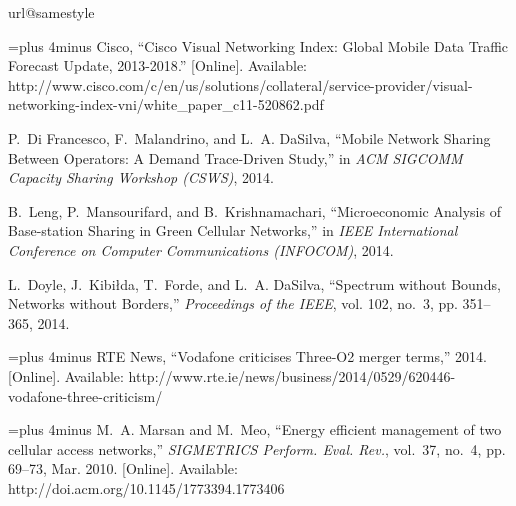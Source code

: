 \documentclass[10pt,journal,cspaper,compsoc]{IEEEtran}
\begin{document}


\begin{thebibliography}{10}
\providecommand{\url}[1]{#1}
\csname url@samestyle\endcsname
\providecommand{\newblock}{\relax}
\providecommand{\bibinfo}[2]{#2}
\providecommand{\BIBentrySTDinterwordspacing}{\spaceskip=0pt\relax}
\providecommand{\BIBentryALTinterwordstretchfactor}{4}
\providecommand{\BIBentryALTinterwordspacing}{\spaceskip=\fontdimen2\font plus
\BIBentryALTinterwordstretchfactor\fontdimen3\font minus
  \fontdimen4\font\relax}
\providecommand{\BIBforeignlanguage}[2]{{\expandafter\ifx\csname l@#1\endcsname\relax
\typeout{** WARNING: IEEEtran.bst: No hyphenation pattern has been}\typeout{** loaded for the language `#1'. Using the pattern for}\typeout{** the default language instead.}\else
\language=\csname l@#1\endcsname
\fi
#2}}
\providecommand{\BIBdecl}{\relax}
\BIBdecl

\BIBentryALTinterwordspacing
Cisco, ``{Cisco Visual Networking Index: Global Mobile Data Traffic Forecast
  Update, 2013-2018}.'' [Online]. Available:
  \url{http://www.cisco.com/c/en/us/solutions/collateral/service-provider/visual-networking-index-vni/white_paper_c11-520862.pdf}
\BIBentrySTDinterwordspacing

P.~{Di Francesco}, F.~Malandrino, and L.~A. DaSilva, ``{Mobile Network Sharing
  Between Operators: A Demand Trace-Driven Study},'' in \emph{ACM SIGCOMM
  Capacity Sharing Workshop (CSWS)}, 2014.

B.~Leng, P.~Mansourifard, and B.~Krishnamachari, ``{Microeconomic Analysis of
  Base-station Sharing in Green Cellular Networks},'' in \emph{IEEE
  International Conference on Computer Communications (INFOCOM)}, 2014.

L.~Doyle, J.~Kibi{\l}da, T.~Forde, and L.~A. DaSilva, ``{Spectrum without
  Bounds, Networks without Borders},'' \emph{Proceedings of the IEEE}, vol.
  102, no.~3, pp. 351--365, 2014.

\BIBentryALTinterwordspacing
{RTE News}, ``{Vodafone criticises Three-O2 merger terms},'' 2014. [Online].
  Available:
  \url{http://www.rte.ie/news/business/2014/0529/620446-vodafone-three-criticism/}
\BIBentrySTDinterwordspacing

\BIBentryALTinterwordspacing
M.~A. Marsan and M.~Meo, ``Energy efficient management of two cellular access
  networks,'' \emph{SIGMETRICS Perform. Eval. Rev.}, vol.~37, no.~4, pp.
  69--73, Mar. 2010. [Online]. Available:
  \url{http://doi.acm.org/10.1145/1773394.1773406}
\BIBentrySTDinterwordspacing


\end{thebibliography}
\end{document}
